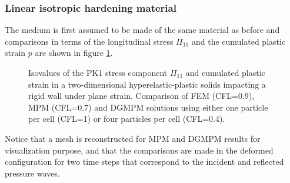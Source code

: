 \subsubsection{Linear isotropic hardening material}
\label{sec:line-isotr-hard}

The medium is first assumed to be made of the same material as before and comparisons in terms of the longitudinal stress $\Pi_{11}$ and the cumulated plastic strain $p$ are shown in figure \ref{fig:PS_taylor}.
\begin{figure}[h!]
  \centering
  \qquad
  \caption{Isovalues of the PK1 stress component $\Pi_{11}$ and cumulated plastic strain in a two-dimensional hyperelastic-plastic solids impacting a rigid wall under plane strain. Comparison of FEM (CFL=0.9), MPM (CFL=0.7) and DGMPM solutions using either one particle per cell (CFL=1) or four particles per cell (CFL=0.4).}
  \label{fig:PS_taylor}
\end{figure}
Notice that a mesh is reconstructed for MPM and DGMPM results for visualization purpose, and that the comparisons are made in the deformed configuration for two time steps that correspond to the incident and reflected pressure waves.


